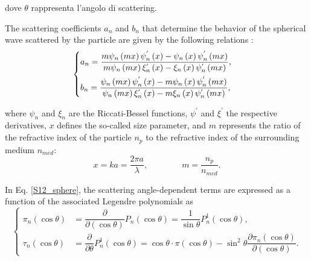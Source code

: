 \documentclass[a4paper, 11pt]{report}
\begin{document}
\noindent dove $\theta$ rappresenta l'angolo di scattering.

The scattering coefficients $a_n$ and $b_n$ that determine the behavior of the spherical wave scattered by the particle are given by the following relations \cite{BH, VdH}:
\begin{equation}
	\vspace*{0.1 cm}
	\begin{cases}
	a_{n} = \dfrac{m \psi_{n} \left( mx \right) \psi_{n}^{'}\left( x \right) - \psi_{n} \left( x \right) \psi_{n}^{'}\left( mx \right)}{m \psi_{n} \left( mx \right) \xi_{n}^{'}\left( x \right) - \xi_{n} \left( x \right) \psi_{n}^{'}\left( mx \right)} , \\[10 pt]
	b_{n} = \dfrac{\psi_{n} \left( mx \right) \psi_{n}^{'}\left( x \right) - m\psi_{n} \left( x \right) \psi_{n}^{'}\left( mx \right)}{\psi_{n} \left( mx \right) \xi_{n}^{'}\left( x \right) - m\xi_{n} \left( x \right) \psi_{n}^{'}\left( mx \right)} ,
	\end{cases}
	\vspace*{0.2 cm}
\label{a_b}
\end{equation}

\noindent where $\psi_{n}$ and $\xi_{n}$ are the Riccati-Bessel functions, $\psi^{'}$ and $\xi^{'}$ the respective derivatives, $x$ defines the so-called size parameter, and $m$ represents the ratio of the refractive index of the particle $n_{p}$ to the refractive index of the surrounding medium $n_{med}$:
\begin{equation}
	x = ka = \dfrac{2\pi a}{\lambda} , \qquad\qquad m = \dfrac{n_{p}}{n_{med}} .
	\label{size_param_and_m}
\end{equation}

In Eq. \ref{S12_sphere}, the scattering angle-dependent terms are expressed as a function of the associated Legendre polynomials as
\begin{equation}
	\begin{cases}
	\pi_{n} \left( \cos\theta \right) &= \dfrac{\partial}{\partial\left( \cos\theta \right)} P_{n}\left( \cos\theta \right) = \dfrac{1}{\sin\theta} P_{n}^{1}\left( \cos\theta \right) , \\[10 pt]
	\tau_{n}\left( \cos\theta \right) &= \dfrac{\partial}{\partial \theta} P^{1}_{n}\left( \cos\theta \right) = \cos\theta \cdot \pi\left( \cos\theta \right) - \sin^{2}\theta \dfrac{\partial \pi_{n}\left( \cos\theta \right)}{\partial \left( \cos\theta \right)} .
	\end{cases}
	\label{pi_tau} 
\end{equation}
\end{document}
